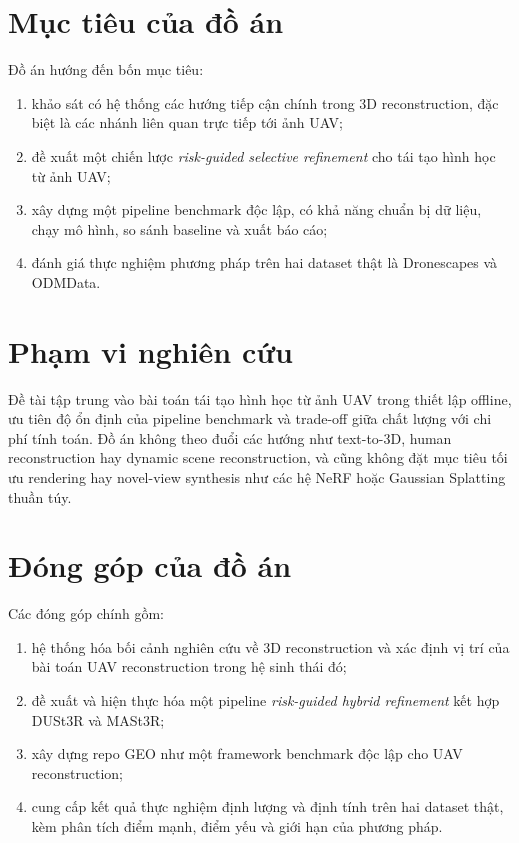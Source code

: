 \documentclass[12pt,a4paper,oneside]{report}
\begin{document}
\section{Mục tiêu của đồ án}

Đồ án hướng đến bốn mục tiêu:
\begin{enumerate}[leftmargin=1.5em]
  \item khảo sát có hệ thống các hướng tiếp cận chính trong 3D reconstruction, đặc biệt là các nhánh liên quan trực tiếp tới ảnh UAV;
  \item đề xuất một chiến lược \textit{risk-guided selective refinement} cho tái tạo hình học từ ảnh UAV;
  \item xây dựng một pipeline benchmark độc lập, có khả năng chuẩn bị dữ liệu, chạy mô hình, so sánh baseline và xuất báo cáo;
  \item đánh giá thực nghiệm phương pháp trên hai dataset thật là Dronescapes và ODMData.
\end{enumerate}

\section{Phạm vi nghiên cứu}

Đề tài tập trung vào bài toán tái tạo hình học từ ảnh UAV trong thiết lập offline, ưu tiên độ ổn định của pipeline benchmark và trade-off giữa chất lượng với chi phí tính toán. Đồ án không theo đuổi các hướng như text-to-3D, human reconstruction hay dynamic scene reconstruction, và cũng không đặt mục tiêu tối ưu rendering hay novel-view synthesis như các hệ NeRF hoặc Gaussian Splatting thuần túy.

\section{Đóng góp của đồ án}

Các đóng góp chính gồm:
\begin{enumerate}[leftmargin=1.5em]
  \item hệ thống hóa bối cảnh nghiên cứu về 3D reconstruction và xác định vị trí của bài toán UAV reconstruction trong hệ sinh thái đó;
  \item đề xuất và hiện thực hóa một pipeline \textit{risk-guided hybrid refinement} kết hợp DUSt3R và MASt3R;
  \item xây dựng repo GEO như một framework benchmark độc lập cho UAV reconstruction;
  \item cung cấp kết quả thực nghiệm định lượng và định tính trên hai dataset thật, kèm phân tích điểm mạnh, điểm yếu và giới hạn của phương pháp.
\end{enumerate}
\end{document}
